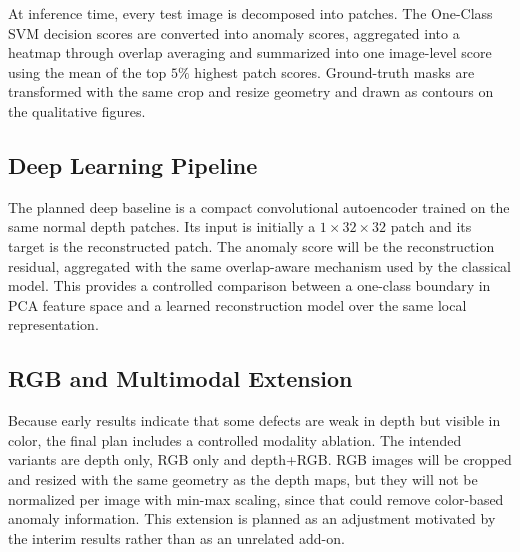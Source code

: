 At inference time, every test image is decomposed into patches. The One-Class SVM decision scores are converted into anomaly scores, aggregated into a heatmap through overlap averaging and summarized into one image-level score using the mean of the top $5\%$ highest patch scores. Ground-truth masks are transformed with the same crop and resize geometry and drawn as contours on the qualitative figures.

\subsection*{Deep Learning Pipeline}
The planned deep baseline is a compact convolutional autoencoder trained on the same normal depth patches. Its input is initially a $1 \times 32 \times 32$ patch and its target is the reconstructed patch. The anomaly score will be the reconstruction residual, aggregated with the same overlap-aware mechanism used by the classical model. This provides a controlled comparison between a one-class boundary in PCA feature space and a learned reconstruction model over the same local representation.

\subsection*{RGB and Multimodal Extension}
Because early results indicate that some defects are weak in depth but visible in color, the final plan includes a controlled modality ablation. The intended variants are depth only, RGB only and depth+RGB. RGB images will be cropped and resized with the same geometry as the depth maps, but they will not be normalized per image with min-max scaling, since that could remove color-based anomaly information. This extension is planned as an adjustment motivated by the interim results rather than as an unrelated add-on.
